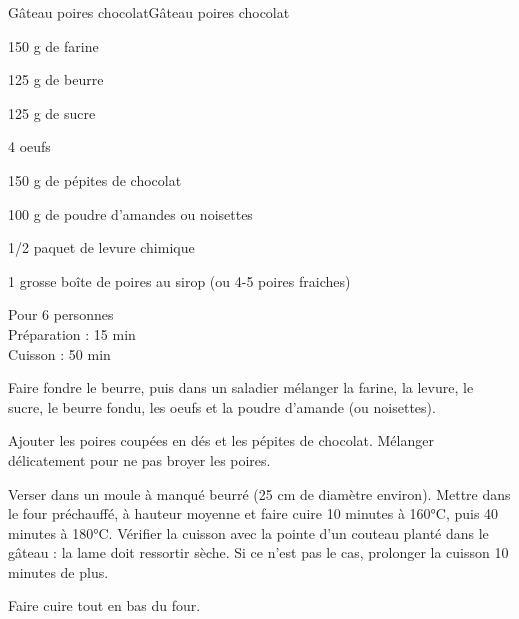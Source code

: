 \begin{recette}{Gâteau poires chocolat}{Gâteau poires chocolat}

\begin{ingredients}
150 g de farine\par
125 g de beurre\par
125 g de sucre\par
4 oeufs\par
150 g de pépites de chocolat\par
100 g de poudre d'amandes ou noisettes\par
1/2 paquet de levure chimique\par
1 grosse boîte de poires au sirop (ou 4-5 poires fraiches)\par
\end{ingredients}

\begin{infos}
Pour 6 personnes\\
Préparation : 15 min\\
Cuisson : 50 min\\
\end{infos}

\begin{etapes}
\item Faire fondre le beurre, puis dans un saladier mélanger la farine, la levure, le sucre, le beurre fondu, les oeufs et la poudre d'amande (ou noisettes).
\item Ajouter les poires coupées en dés et les pépites de chocolat. Mélanger délicatement pour ne pas broyer les poires.
\item Verser dans un moule à manqué beurré (25 cm de diamètre environ). Mettre dans le four préchauffé, à hauteur moyenne et faire cuire 10 minutes à 160°C, puis 40 minutes à 180°C. Vérifier la cuisson avec la pointe d'un couteau planté dans le gâteau : la lame doit ressortir sèche. Si ce n'est pas le cas, prolonger la cuisson 10 minutes de plus.
\end{etapes}

\begin{conseils}
Faire cuire tout en bas du four.
\end{conseils}

\end{recette}